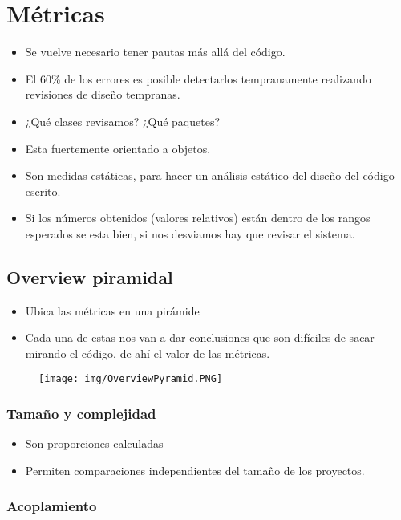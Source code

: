 \section{Métricas}
\begin{itemize}
\item Se vuelve necesario tener pautas más allá del código.
\item El 60\% de los errores es posible detectarlos tempranamente realizando revisiones de diseño tempranas.
\item ¿Qué clases revisamos? ¿Qué paquetes?
\item Esta fuertemente orientado a objetos.
\item Son medidas estáticas, para hacer un análisis estático del diseño del código escrito.
\item Si los números obtenidos (valores relativos) están dentro de los rangos esperados se esta bien, si nos desviamos hay que revisar el sistema.
\end{itemize}



\subsection*{Overview piramidal}

\begin{itemize}
\item Ubica las métricas en una pirámide
\item Cada una de estas nos van a dar conclusiones que son difíciles de sacar mirando el código, de ahí el valor de las métricas.
\end{itemize}

\begin{figure}[!htb]
    \centering
    \texttt{[image: img/OverviewPyramid.PNG]}
\end{figure}

\subsubsection*{Tamaño y complejidad}

\begin{itemize}
\item Son proporciones calculadas
\item Permiten comparaciones independientes del tamaño de los proyectos.
\end{itemize}


\subsubsection*{Acoplamiento}

